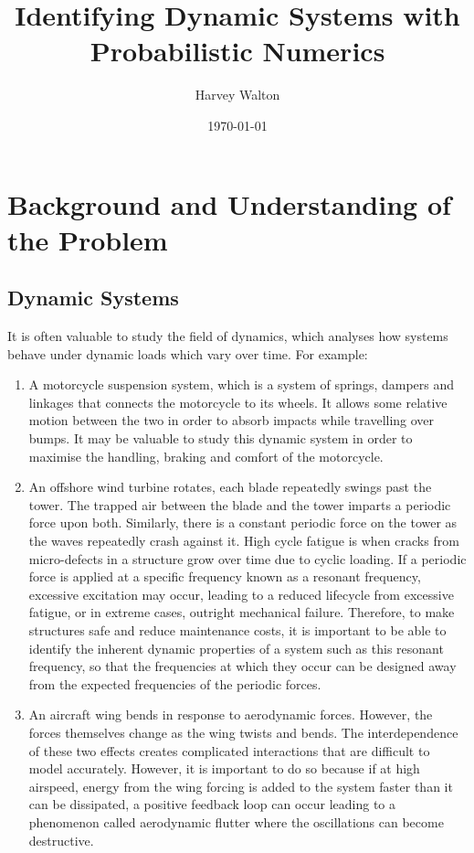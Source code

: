 \documentclass[12pt]{article}
\title{Identifying Dynamic Systems with Probabilistic Numerics}
\author{Harvey Walton}
\date{\today}
\begin{document}

    \thispagestyle{empty}
    

    \printnomenclature

    \newpage
    \tableofcontents
    \newpage


    \section{Background and Understanding of the Problem}

    \subsection{Dynamic Systems}
    It is often valuable to study the field of dynamics, which analyses how systems behave under dynamic loads which vary over time.
    For example:
    \begin{enumerate}
        \item A motorcycle suspension system, which is a system of springs, dampers and linkages that connects the motorcycle to its wheels.
        It allows some relative motion between the two in order to absorb impacts while travelling over bumps.
        It may be valuable to study this dynamic system in order to maximise the handling, braking and comfort of the motorcycle.

        \item An offshore wind turbine rotates, each blade repeatedly swings past the tower.
        The trapped air between the blade and the tower imparts a periodic force upon both.
        Similarly, there is a constant periodic force on the tower as the waves repeatedly crash against it.
        High cycle fatigue is when cracks from micro-defects in a structure grow over time due to cyclic loading.
        If a periodic force is applied at a specific frequency known as a resonant frequency, excessive excitation may occur, leading to a reduced lifecycle from excessive fatigue, or in extreme cases, outright mechanical failure.
        Therefore, to make structures safe and reduce maintenance costs, it is important to be able to identify the inherent dynamic properties of a system such as this resonant frequency, so that the frequencies at which they occur can be designed away from the expected frequencies of the periodic forces.

        \item An aircraft wing bends in response to aerodynamic forces.
        However, the forces themselves change as the wing twists and bends.
        The interdependence of these two effects creates complicated interactions that are difficult to model accurately.
        However, it is important to do so because if at high airspeed, energy from the wing forcing is added to the system faster than it can be dissipated, a positive feedback loop can occur leading to a phenomenon called aerodynamic flutter where the oscillations can become destructive.
    \end{enumerate}
\end{document}
